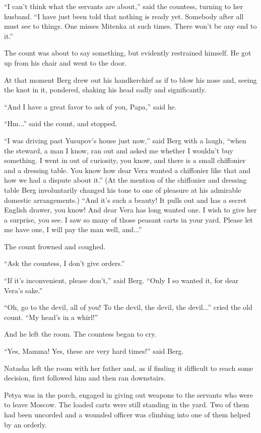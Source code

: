 ``I can't think what the servants are about,'' said the countess,
turning to her husband. ``I have just been told that nothing is
ready yet.  Somebody after all must see to things. One misses
Mitenka at such times.  There won't be any end to it.''

The count was about to say something, but evidently restrained
himself.  He got up from his chair and went to the door.

At that moment Berg drew out his handkerchief as if to blow his
nose and, seeing the knot in it, pondered, shaking his head sadly
and significantly.

``And I have a great favor to ask of you, Papa,'' said he.

``Hm...'' said the count, and stopped.

``I was driving past Yusupov's house just now,'' said Berg with a
laugh, ``when the steward, a man I know, ran out and asked me
whether I wouldn't buy something. I went in out of curiosity, you
know, and there is a small chiffonier and a dressing table. You
know how dear Vera wanted a chiffonier like that and how we had a
dispute about it.'' (At the mention of the chiffonier and
dressing table Berg involuntarily changed his tone to one of
pleasure at his admirable domestic arrangements.) ``And it's such
a beauty! It pulls out and has a secret English drawer, you know!
And dear Vera has long wanted one. I wish to give her a surprise,
you see. I saw so many of those peasant carts in your
yard. Please let me have one, I will pay the man well, and...''

The count frowned and coughed.

``Ask the countess, I don't give orders.''

``If it's inconvenient, please don't,'' said Berg. ``Only I so
wanted it, for dear Vera's sake.''

``Oh, go to the devil, all of you! To the devil, the devil, the
devil...''  cried the old count. ``My head's in a whirl!''

And he left the room. The countess began to cry.

``Yes, Mamma! Yes, these are very hard times!'' said Berg.

Natasha left the room with her father and, as if finding it
difficult to reach some decision, first followed him and then ran
downstairs.

Petya was in the porch, engaged in giving out weapons to the
servants who were to leave Moscow. The loaded carts were still
standing in the yard. Two of them had been uncorded and a wounded
officer was climbing into one of them helped by an orderly.

